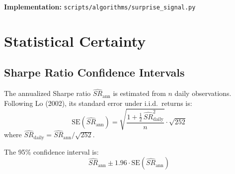 \documentclass[11pt,a4paper]{article}
\begin{document}
\textbf{Implementation:} \texttt{scripts/algorithms/surprise\_signal.py}

\section{Statistical Certainty}

\subsection{Sharpe Ratio Confidence Intervals}

The annualized Sharpe ratio $\widehat{SR}_{\text{ann}}$ is estimated from $n$ daily observations. Following Lo (2002), its standard error under i.i.d.\ returns is:
\begin{equation}
\mathrm{SE}(\widehat{SR}_{\text{ann}}) = \sqrt{\frac{1 + \frac{1}{2}\,\widehat{SR}_{\text{daily}}^2}{n}} \cdot \sqrt{252}
\end{equation}
where $\widehat{SR}_{\text{daily}} = \widehat{SR}_{\text{ann}} / \sqrt{252}$.

The 95\% confidence interval is:
\begin{equation}
\widehat{SR}_{\text{ann}} \pm 1.96 \cdot \mathrm{SE}(\widehat{SR}_{\text{ann}})
\end{equation}
\end{document}
